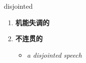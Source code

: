 
\begin{frame}
{\huge disjointed}
\begin{center}
\begin{enumerate}\Large
  \item \textbf{机能失调的}
  \item \textbf{不连贯的}
  \begin{itemize}
    \item \em{\Large{a disjointed speech}}
  \end{itemize}
\end{enumerate}
\end{center}
\end{frame}
